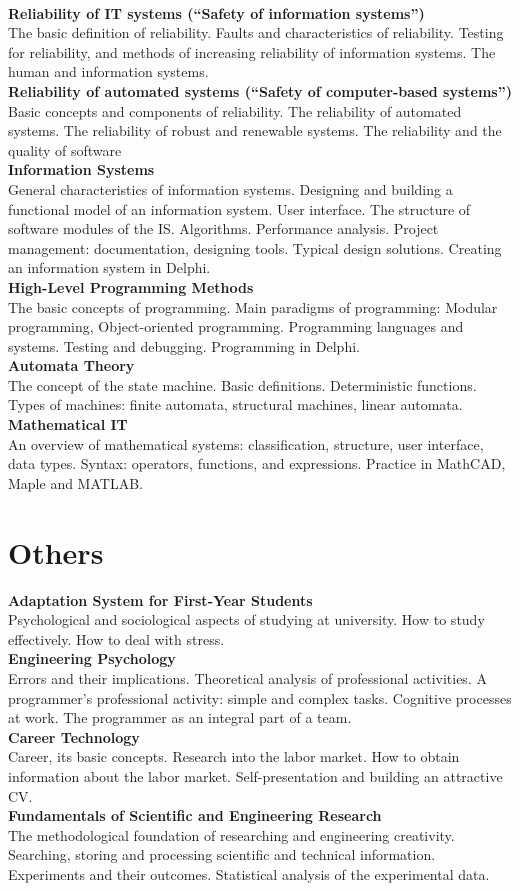 \documentclass[a4paper, 12pt]{article}
\newcommand{\group}[1] {\section{#1}}
\newcommand{\discipline}[1] {\textbf{#1} \\ }
\newcommand{\desc}[1] { #1 \\ }
\begin{document}
\

\discipline{Reliability of IT systems (``Safety of information systems'')}
\desc{The basic definition of reliability. Faults and characteristics of reliability. Testing for reliability, and methods of increasing reliability of information systems. The human and information systems.}

\discipline{Reliability of automated systems (``Safety of computer-based systems'')}
\desc{Basic concepts and components of reliability. The reliability of automated systems. The reliability of robust  and renewable systems. The reliability and the quality of software}

\discipline{Information Systems}
\desc{General characteristics of information systems. Designing and building a functional model of an information system. User interface. The structure of software modules of the IS. Algorithms. Performance analysis. Project management: documentation, designing tools. Typical design solutions. Creating an information system in Delphi.}

\discipline{High-Level Programming Methods}
\desc{The basic concepts of programming. Main paradigms of programming: Modular programming, Object-oriented programming. Programming languages and systems. Testing and debugging. Programming in Delphi.}

\discipline{Automata Theory}
\desc{The concept of the state machine. Basic definitions. Deterministic functions. Types of machines: finite automata, structural machines, linear automata.}

\discipline{Mathematical IT}
\desc{An overview of mathematical systems: classification, structure, user interface, data types. Syntax: operators, functions, and expressions. Practice in MathCAD, Maple and MATLAB.}


\group{Others}

\discipline{Adaptation System for First-Year Students}
\desc{Psychological and sociological aspects of studying at university. How to study effectively. How to deal with stress.}

\discipline{Engineering Psychology}
\desc{Errors and their implications. Theoretical analysis of professional activities. A programmer's professional activity: simple and complex tasks. Cognitive processes at work. The programmer as an integral part of a team.}

\discipline{Career Technology}
\desc{Career, its basic concepts. Research into the labor market. How to obtain information about the labor market. Self-presentation and building an attractive CV.}

\discipline{Fundamentals of Scientific and Engineering Research}
\desc{The methodological foundation of researching and engineering creativity. Searching, storing and processing scientific and technical information. Experiments and their outcomes. Statistical analysis of the experimental data.}
\end{document}
